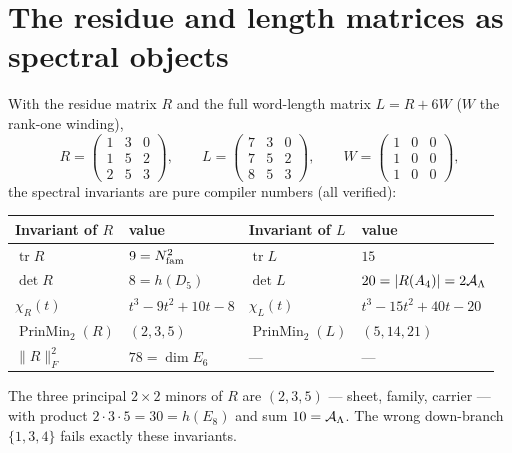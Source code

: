 \section{The residue and length matrices as spectral objects}
With the residue matrix $R$ and the full word-length matrix $L=R+6W$ ($W$ the rank-one winding),
\[
  R=\begin{pmatrix}1&3&0\\1&5&2\\2&5&3\end{pmatrix},\qquad
  L=\begin{pmatrix}7&3&0\\7&5&2\\8&5&3\end{pmatrix},\qquad
  W=\begin{pmatrix}1&0&0\\1&0&0\\1&0&0\end{pmatrix},
\]
the spectral invariants are pure compiler numbers (all verified):
\begin{center}\small
\renewcommand{\arraystretch}{1.25}
\begin{tabularx}{\linewidth}{@{}lYlY@{}}
\toprule
\textbf{Invariant of $R$} & \textbf{value} & \textbf{Invariant of $L$} & \textbf{value} \\
\midrule
$\operatorname{tr}R$ & $9=N_{\mathrm{fam}}^2$ & $\operatorname{tr}L$ & $15$ \\
$\det R$ & $8=h(D_5)$ & $\det L$ & $20=|R(A_4)|=2\mathcal A_\Lambda$ \\
$\chi_R(t)$ & $t^3-9t^2+10t-8$ & $\chi_L(t)$ & $t^3-15t^2+40t-20$ \\
$\operatorname{PrinMin}_2(R)$ & $(2,3,5)$ & $\operatorname{PrinMin}_2(L)$ & $(5,14,21)$ \\
$\|R\|_F^2$ & $78=\dim E_6$ & --- & --- \\
\bottomrule
\end{tabularx}
\end{center}

\noindent The three principal $2{\times}2$ minors of $R$ are $(2,3,5)$ --- sheet, family, carrier ---
with product $2\cdot3\cdot5=30=h(E_8)$ and sum $10=\mathcal A_\Lambda$. The wrong down-branch $\{1,3,4\}$ fails exactly
these invariants.


